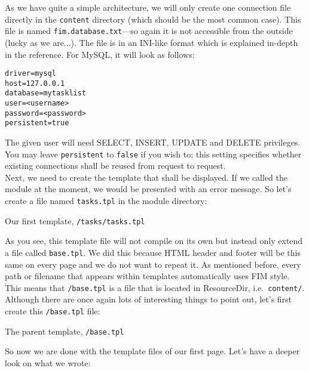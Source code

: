 \documentclass{scrartcl}
\begin{document}
      As we have quite a simple architecture, we will only create one connection file directly in the \texttt{content} directory (which should be the most common case). This file is named \texttt{fim.database.txt}---so again it is not accessible from the outside (lucky as we are...). The file is in an INI-like format which is explained in-depth in the reference. For MySQL, it will look as follows:
      \begin{verbatim}
driver=mysql
host=127.0.0.1
database=mytasklist
user=<username>
password=<password>
persistent=true
      \end{verbatim}
      The given user will need SELECT, INSERT, UPDATE and DELETE privileges. You may leave \texttt{persistent} to \texttt{false} if you wish to; this setting specifies whether existing connections shall be reused from request to request. \\
      Next, we need to create the template that shall be displayed. If we called the module at the moment, we would be presented with an error message. So let's create a file named \texttt{tasks.tpl} in the module directory:
      \begin{listing}[H]
         \caption{Our first template, \texttt{/tasks/tasks.tpl}}
      \end{listing}
      As you see, this template file will not compile on its own but instead only extend a file called \texttt{base.tpl}. We did this because HTML header and footer will be this same on every page and we do not want to repeat it. As mentioned before, every path or filename that appears within templates automatically uses FIM style. This means that \texttt{/base.tpl} is a file that is located in ResourceDir, i.e.\ \texttt{content/}. \\
      Although there are once again lots of interesting things to point out, let's first create this \texttt{/base.tpl} file:
      \begin{listing}[H]
         \caption{The parent template, \texttt{/base.tpl}}
      \end{listing}
      So now we are done with the template files of our first page. Let's have a deeper look on what we wrote: \label{tf1}
\end{document}

